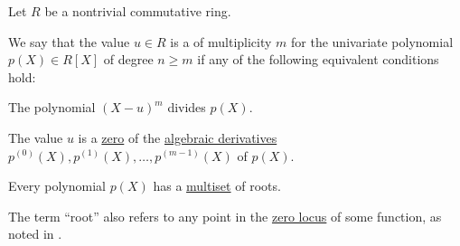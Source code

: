 \begin{definition}\label{def:polynomial_root}
  Let \( R \) be a nontrivial commutative ring.

  We say that the value \( u \in R \) is a  of multiplicity \( m \) for the univariate polynomial \( p(X) \in R[X] \) of degree \( n \geq m \) if any of the following equivalent conditions hold:
  \begin{thmenum}
     The polynomial \( (X - u)^m \) divides \( p(X) \).

     The value \( u \) is a \hyperref[def:zero_locus]{zero} of the \hyperref[def:algebraic_derivative]{algebraic derivatives} \( p^{(0)}(X), p^{(1)}(X), \ldots, p^{(m-1)}(X) \) of \( p(X) \).
  \end{thmenum}

  Every polynomial \( p(X) \) has a \hyperref[def:labeled_set/multiset]{multiset} of roots.

  The term \enquote{root} also refers to any point in the \hyperref[def:zero_locus]{zero locus} of some function, as noted in .
\end{definition}
